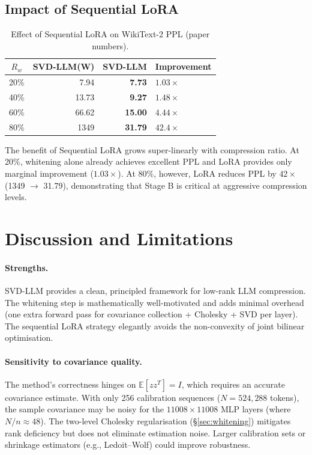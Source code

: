 \documentclass[11pt,a4paper]{article}
\newcommand{\Ebb}{\mathbb{E}}
\theoremstyle{remark}
\begin{document}
\subsection{Impact of Sequential LoRA}

\begin{table}[H]
\centering
\caption{Effect of Sequential LoRA on WikiText-2 PPL (paper numbers).}
\label{tab:lora_effect}
\begin{tabular}{@{}crrl@{}}
\toprule
$R_w$ & SVD-LLM(W) & SVD-LLM & Improvement \\
\midrule
20\% &    7.94 & \textbf{7.73}  & $1.03\times$ \\
40\% &   13.73 & \textbf{9.27}  & $1.48\times$ \\
60\% &   66.62 & \textbf{15.00} & $4.44\times$ \\
80\% &   1349  & \textbf{31.79} & $42.4\times$ \\
\bottomrule
\end{tabular}
\end{table}

The benefit of Sequential LoRA grows super-linearly with compression ratio.
At 20\%, whitening alone already achieves excellent PPL and LoRA provides only
marginal improvement ($1.03\times$).  At 80\%, however, LoRA reduces PPL by
$42\times$ (1349 $\to$ 31.79), demonstrating that Stage B is critical at
aggressive compression levels.

\section{Discussion and Limitations}
\label{sec:discussion}

\paragraph{Strengths.}
SVD-LLM provides a clean, principled framework for low-rank LLM compression.
The whitening step is mathematically well-motivated and adds minimal overhead
(one extra forward pass for covariance collection + Cholesky + SVD per layer).
The sequential LoRA strategy elegantly avoids the non-convexity of joint
bilinear optimisation.

\paragraph{Sensitivity to covariance quality.}
The method's correctness hinges on $\Ebb[zz^T] = I$, which requires an
accurate covariance estimate.  With only 256 calibration sequences ($N =
524{,}288$ tokens), the sample covariance may be noisy for the $11008 \times
11008$ MLP layers (where $N/n \approx 48$).  The two-level Cholesky
regularisation (\S\ref{sec:whitening}) mitigates rank deficiency but does not
eliminate estimation noise.  Larger calibration sets or shrinkage estimators
(e.g., Ledoit--Wolf) could improve robustness.
\end{document}
